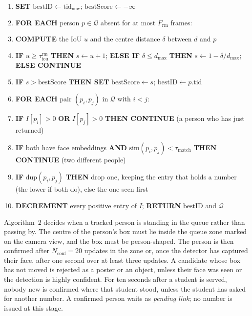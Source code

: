 \documentclass{research}
\newenvironment{algsteps}
  {\setlength{\topsep}{2pt}\begin{enumerate}%
   \setlength{\itemsep}{0pt}\setlength{\parsep}{0pt}}
  {\end{enumerate}}
\begin{document}
\begin{algsteps}
  \item \textbf{SET} $\mathrm{bestID} \gets \mathrm{tid}_{\mathrm{new}}$;
        $\mathrm{bestScore} \gets -\infty$
  \item \textbf{FOR EACH} person $p \in \mathcal{Q}$ absent for at most
        $F_{\mathrm{rm}}$ frames:
  \item \quad \textbf{COMPUTE} the IoU $u$ and the centre distance
        $\delta$ between $d$ and $p$
  \item \quad \textbf{IF} $u \geq \tau_{\mathrm{iou}}^{\mathrm{rm}}$
        \textbf{THEN} $s \gets u + 1$; \textbf{ELSE IF}
        $\delta \leq d_{\max}$ \textbf{THEN} $s \gets 1 - \delta/d_{\max}$;
        \textbf{ELSE CONTINUE}
  \item \quad \textbf{IF} $s > \mathrm{bestScore}$ \textbf{THEN SET}
        $\mathrm{bestScore} \gets s$; $\mathrm{bestID} \gets p.\mathrm{tid}$
  \item \textbf{FOR EACH} pair $(p_i, p_j)$ in $\mathcal{Q}$ with $i < j$:
  \item \quad \textbf{IF} $I[p_i] > 0$ \textbf{OR} $I[p_j] > 0$
        \textbf{THEN CONTINUE} (a person who has just returned)
  \item \quad \textbf{IF} both have face embeddings \textbf{AND}
        $\mathrm{sim}(p_i, p_j) < \tau_{\mathrm{match}}$ \textbf{THEN
        CONTINUE} (two different people)
  \item \quad \textbf{IF} $\mathrm{dup}(p_i, p_j)$ \textbf{THEN} drop one,
        keeping the entry that holds a number (the lower if both do),
        else the one seen first
  \item \textbf{DECREMENT} every positive entry of $I$; \textbf{RETURN}
        $\mathrm{bestID}$ and $\mathcal{Q}$
\end{algsteps}
\vspace{0.3em}

Algorithm~2 decides when a tracked person is standing in the queue
rather than passing by. The centre of the person's box must lie inside
the queue zone marked on the camera view, and the box must be
person-shaped. The person is then confirmed after $N_{\mathrm{conf}} =
20$ updates in the zone or, once the detector has captured their face,
after one second over at least three updates. A candidate whose box has
not moved is rejected as a poster or an object, unless their face was
seen or the detection is highly confident. For ten seconds after a
student is served, nobody new is confirmed where that student stood,
unless the student has asked for another number. A confirmed person
waits as \emph{pending link}; no number is issued at this stage.
\end{document}
